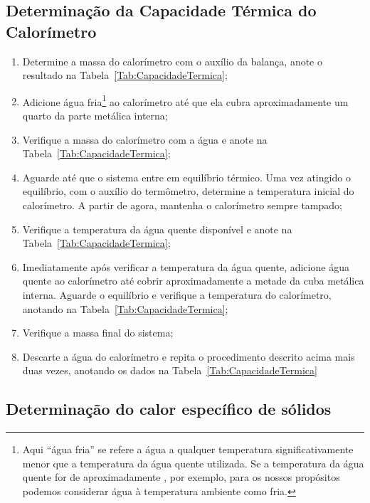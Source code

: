 \subsection{Determinação da Capacidade Térmica do Calorímetro} %
\begin{enumerate}
	\item Determine a massa do calorímetro com o auxílio da balança, anote o resultado na Tabela~\ref{Tab:CapacidadeTermica};
	\item Adicione água fria\footnote{Aqui ``água fria'' se refere a água a qualquer temperatura significativamente menor que a temperatura da água quente utilizada. Se a temperatura da água quente for de aproximadamente , por exemplo, para os nossos propósitos podemos considerar água à temperatura ambiente como fria.} ao calorímetro até que ela cubra aproximadamente um quarto da parte metálica interna;
	\item Verifique a massa do calorímetro com a água e anote na Tabela~\ref{Tab:CapacidadeTermica};
	\item Aguarde até que o sistema entre em equilíbrio térmico. Uma vez atingido o equilíbrio, com o auxílio do termômetro, determine a temperatura inicial do calorímetro. A partir de agora, mantenha o calorímetro sempre tampado;
	\item Verifique a temperatura da água quente disponível e anote na Tabela~\ref{Tab:CapacidadeTermica};
	\item Imediatamente após verificar a temperatura da água quente, adicione água quente ao calorímetro até cobrir aproximadamente a metade da cuba metálica interna. Aguarde o equilíbrio e verifique a temperatura do calorímetro, anotando na Tabela~\ref{Tab:CapacidadeTermica};
	\item Verifique a massa final do sistema;
	\item Descarte a água do calorímetro e repita o procedimento descrito acima mais duas vezes, anotando os dados na Tabela~\ref{Tab:CapacidadeTermica}
\end{enumerate}

\subsection{Determinação do calor específico de sólidos}


